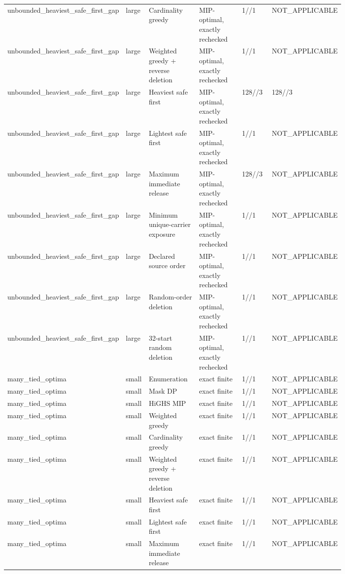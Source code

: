 {\begin{longtable}{p{0.18\linewidth}p{0.07\linewidth}p{0.17\linewidth}p{0.16\linewidth}p{0.10\linewidth}p{0.12\linewidth}}
unbounded\_heaviest\_safe\_first\_gap & large & Cardinality greedy & MIP-optimal, exactly rechecked & 1//1 & NOT\_APPLICABLE \\
unbounded\_heaviest\_safe\_first\_gap & large & Weighted greedy + reverse deletion & MIP-optimal, exactly rechecked & 1//1 & NOT\_APPLICABLE \\
unbounded\_heaviest\_safe\_first\_gap & large & Heaviest safe first & MIP-optimal, exactly rechecked & 128//3 & 128//3 \\
unbounded\_heaviest\_safe\_first\_gap & large & Lightest safe first & MIP-optimal, exactly rechecked & 1//1 & NOT\_APPLICABLE \\
unbounded\_heaviest\_safe\_first\_gap & large & Maximum immediate release & MIP-optimal, exactly rechecked & 128//3 & NOT\_APPLICABLE \\
unbounded\_heaviest\_safe\_first\_gap & large & Minimum unique-carrier exposure & MIP-optimal, exactly rechecked & 1//1 & NOT\_APPLICABLE \\
unbounded\_heaviest\_safe\_first\_gap & large & Declared source order & MIP-optimal, exactly rechecked & 1//1 & NOT\_APPLICABLE \\
unbounded\_heaviest\_safe\_first\_gap & large & Random-order deletion & MIP-optimal, exactly rechecked & 1//1 & NOT\_APPLICABLE \\
unbounded\_heaviest\_safe\_first\_gap & large & 32-start random deletion & MIP-optimal, exactly rechecked & 1//1 & NOT\_APPLICABLE \\
many\_tied\_optima & small & Enumeration & exact finite & 1//1 & NOT\_APPLICABLE \\
many\_tied\_optima & small & Mask DP & exact finite & 1//1 & NOT\_APPLICABLE \\
many\_tied\_optima & small & HiGHS MIP & exact finite & 1//1 & NOT\_APPLICABLE \\
many\_tied\_optima & small & Weighted greedy & exact finite & 1//1 & NOT\_APPLICABLE \\
many\_tied\_optima & small & Cardinality greedy & exact finite & 1//1 & NOT\_APPLICABLE \\
many\_tied\_optima & small & Weighted greedy + reverse deletion & exact finite & 1//1 & NOT\_APPLICABLE \\
many\_tied\_optima & small & Heaviest safe first & exact finite & 1//1 & NOT\_APPLICABLE \\
many\_tied\_optima & small & Lightest safe first & exact finite & 1//1 & NOT\_APPLICABLE \\
many\_tied\_optima & small & Maximum immediate release & exact finite & 1//1 & NOT\_APPLICABLE \\

\end{longtable}}
